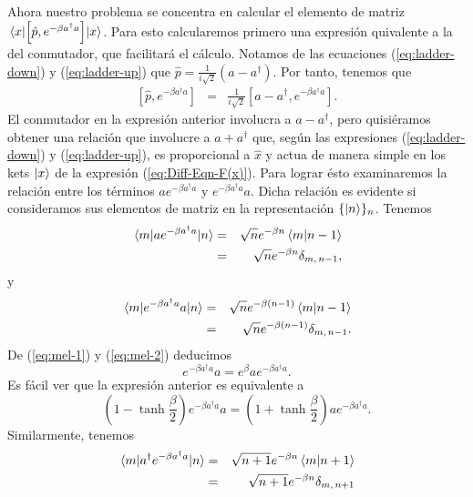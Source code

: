 \documentclass[%
 reprint,
 amsmath,amssymb,
 aps,
 pra,
]{revtex4-2}
\begin{document}
Ahora nuestro problema se concentra en calcular el elemento de matriz $\ev{\left[\hat{p},e^{-\beta a^\dag a}\right]}{x}$. Para esto calcularemos primero una expresión quivalente a la del conmutador, que facilitará el cálculo. Notamos de las ecuaciones (\ref{eq:ladder-down}) y (\ref{eq:ladder-up}) que $\hat{p} = \frac{1}{i\sqrt{2}}\left(a-a^\dag\right)$. Por tanto, tenemos que
\begin{eqnarray}
	\left[\hat{p},e^{-\beta a^\dag a}\right] 	&=& \frac{1}{i\sqrt{2}}\left[a-a^\dag,e^{-\beta a^\dag a}\right]. \label{eq:commutator}
\end{eqnarray}
El conmutador en la expresión anterior involucra a $a-a^\dag$, pero quisiéramos obtener una relación que involucre a $a+a^\dag$ que, según las expresiones (\ref{eq:ladder-down}) y (\ref{eq:ladder-up}), es proporcional a $\hat{x}$ y actua de manera simple en los kets $\ket{x}$ de la expresión (\ref{eq:Diff-Eqn-F(x)}). Para lograr ésto examinaremos la relación entre los términos $a e^{-\beta a^\dag a}$ y $e^{-\beta a^\dag a}a$. Dicha relación es evidente si consideramos sus elementos de matriz en la representación $\{\ket{n}\}_n$. Tenemos
\begin{eqnarray}
	\mel{m}{a e^{-\beta a^\dag a}}{n} 	&=& \sqrt{n}e^{-\beta n} \braket{m}{n-1} \nonumber \\
										&=&  \sqrt{n}e^{-\beta n} \delta_{m,\,n-1}, \label{eq:mel-1}
\end{eqnarray}
y
\begin{eqnarray}
	\mel{m}{e^{-\beta a^\dag a} a}{n} 	&=& \sqrt{n}e^{-\beta (n-1)} \braket{m}{n-1} \nonumber\\
										&=&  \sqrt{n}e^{-\beta (n-1)} \delta_{m,\,n-1}. \label{eq:mel-2}
\end{eqnarray}
De (\ref{eq:mel-1}) y (\ref{eq:mel-2}) deducimos 
\begin{equation}
	e^{-\beta a^\dag a} a = e^\beta a e^{-\beta a^\dag a}.
\end{equation}
Es fácil ver que la expresión anterior es equivalente a
\begin{equation}
	\left(1-\tanh\frac{\beta}{2}\right)e^{-\beta a^\dag a} a = \left(1+\tanh\frac{\beta}{2}\right) a e^{-\beta a^\dag a}. \label{eq:relation-a-times-exp}
\end{equation}
Similarmente, tenemos
\begin{eqnarray}
	\mel{m}{a^\dag e^{-\beta a^\dag a}}{n} 	&=& \sqrt{n+1}e^{-\beta n} \braket{m}{n+1} \nonumber \\
										&=&  \sqrt{n+1}e^{-\beta n} \delta_{m,\,n+1} \label{eq:mel-3}
\end{eqnarray}
\end{document}
